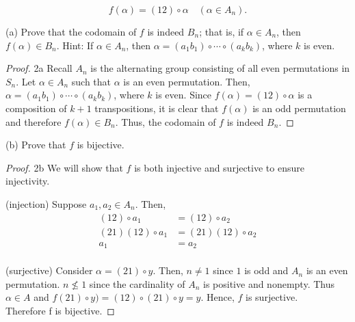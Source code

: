 \documentclass[12pt]{article}
\begin{document}
$$
f(\alpha)=(12) \circ \alpha \quad\left(\alpha \in A_{n}\right).
$$

(a) Prove that the codomain of $f$ is indeed $B_{n}$; that is, if $\alpha \in A_{n}$, then $f(\alpha) \in B_{n}$. Hint: If $\alpha \in A_{n}$, then $\alpha=\left(a_{1} b_{1}\right) \circ \cdots \circ\left(a_{k} b_{k}\right)$, where $k$ is even.

\begin{proof}{2a} 
	Recall $A_n$ is the alternating group consisting of all even
	permutations in $S_n$. 
	Let $\alpha \in A_{n}$ such that $\alpha$ is an even permutation. Then,
	$\alpha=\left(a_{1} b_{1}\right) \circ \cdots \circ\left(a_{k} b_{k}\right)$, where $k$ is even.
	Since $f(\alpha)=(12)\circ \alpha$ is a composition of $k+1$
	transpositions, it is clear that $f(\alpha)$ is an odd 
	permutation and therefore $f(\alpha) \in B_n$. Thus,
	the codomain of $f$ is indeed $B_n$.
\end{proof}

(b) Prove that $f$ is bijective.

\begin{proof}{2b} We will show that $f$ is both injective and surjective to ensure injectivity.

	(injection) 
	Suppose $a_1, a_2 \in A_n$. Then,
		$$
		\begin{aligned}
			(12)\circ a_1 &= (12)\circ a_2 \\
			(21)(12)\circ a_1 &= (21)(12)\circ a_2 \\
			a_1 &= a_2 \\
		\end{aligned}
		$$
	
	(surjective)
	Consider $\alpha=(21)\circ y$.  Then,
	$n \neq 1$ since $1$ is odd and $A_n$ is an even permutation.
	$n \not\leq 1$ since the cardinality of $A_n$ is positive and nonempty.
	Thus $\alpha \in A$ and $f(21)\circ y) = (12)\circ(21)\circ y = y$. 
	Hence, $f$ is surjective. \\

	Therefore f is bijective.



\end{proof}
\end{document}

